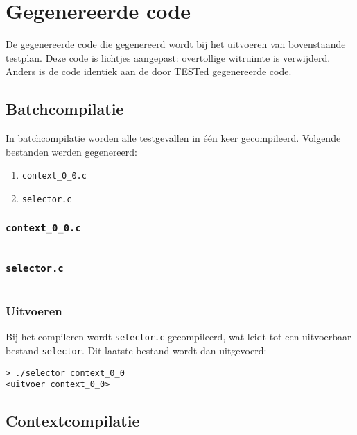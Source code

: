 \section{Gegenereerde code}\label{sec:echo-function-gegenereerde-code}

De gegenereerde code die gegenereerd wordt bij het uitvoeren van bovenstaande testplan.
Deze code is lichtjes aangepast: overtollige witruimte is verwijderd.
Anders is de code identiek aan de door TESTed gegenereerde code.

\subsection{Batchcompilatie}\label{subsec:echo-function-batchcompilatie}

In batchcompilatie worden alle testgevallen in één keer gecompileerd.
Volgende bestanden werden gegenereerd:

\begin{enumerate}
    \item \texttt{context\_0\_0.c}
    \item \texttt{selector.c}
\end{enumerate}

\subsubsection{\texttt{context\_0\_0.c}}

\inputminted{c}{code/echo-function-c/context_0_0.c}

\subsubsection{\texttt{selector.c}}

\inputminted{c}{code/echo-function-c/selector.c}

\subsubsection{Uitvoeren}

Bij het compileren wordt \texttt{selector.c} gecompileerd, wat leidt tot een uitvoerbaar bestand \texttt{selector}.
Dit laatste bestand wordt dan uitgevoerd:

\begin{verbatim}
> ./selector context_0_0
<uitvoer context_0_0>
\end{verbatim}

\subsection{Contextcompilatie}\label{subsec:echo-function-contextcompilatie}


